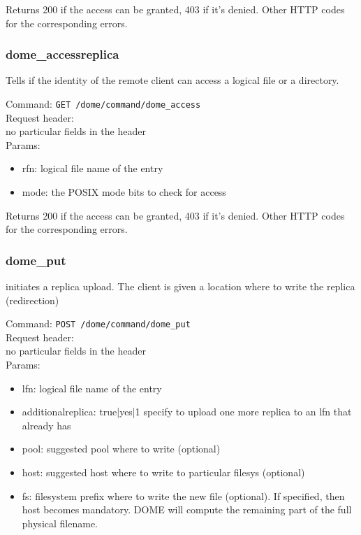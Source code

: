 \documentclass[a4paper,10pt]{scrreprt}
\begin{document}
Returns 200 if the access can be granted, 403 if it's denied. Other HTTP codes for the corresponding errors.\\


\subsubsection{dome\_accessreplica}
Tells if the identity of the remote client can access a logical file or a directory. 

Command:
\lstinline"GET /dome/command/dome_access"\\
Request header:\\
 no particular fields in the header\\
Params:
\begin{itemize}
 \item rfn: logical file name of the entry
 \item mode: the POSIX mode bits to check for access
\end{itemize}

Returns 200 if the access can be granted, 403 if it's denied. Other HTTP codes for the corresponding errors.\\



\subsubsection{dome\_put}
initiates a replica upload. The client is given a location where to write the replica (redirection)

Command:
\lstinline"POST /dome/command/dome_put"\\
Request header:\\
 no particular fields in the header\\
Params:
\begin{itemize}
 \item lfn: logical file name of the entry
 \item additionalreplica: true|yes|1   specify to upload one more replica to an lfn that already has
 \item pool: suggested pool where to write (optional)
 \item host: suggested host where to write to particular filesys (optional)
 \item fs: filesystem prefix where to write the new file (optional). If specified, then host becomes mandatory. DOME will compute the remaining part of the full physical filename.
\end{itemize}
\end{document}
